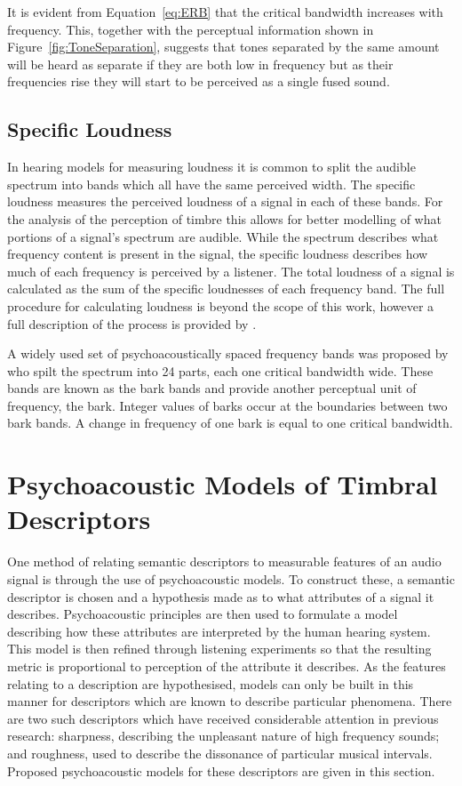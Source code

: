 		It is evident from Equation~\ref{eq:ERB} that the critical bandwidth increases with frequency. This,
		together with the perceptual information shown in Figure~\ref{fig:ToneSeparation}, suggests that tones
		separated by the same amount will be heard as separate if they are both low in frequency but as their
		frequencies rise they will start to be perceived as a single fused sound.

	\subsection{Specific Loudness}
	\label{sec:Timbre-PsychoacousticPrinciples-SpecificLoudness}
		In hearing models for measuring loudness it is common to split the audible spectrum into bands which all
		have the same perceived width. The specific loudness measures the perceived loudness of a signal in each of
		these bands. For the analysis of the perception of timbre this allows for better modelling of what portions
		of a signal's spectrum are audible. While the spectrum describes what frequency content is present in the
		signal, the specific loudness describes how much of each frequency is perceived by a listener.  The total
		loudness of a signal is calculated as the sum of the specific loudnesses of each frequency band. The full
		procedure for calculating loudness is beyond the scope of this work, however a full description of the
		process is provided by \citet{moore1997a}.

		A widely used set of psychoacoustically spaced frequency bands was proposed by
		\citet{zwicker1961subdivision} who spilt the spectrum into 24 parts, each one critical bandwidth wide.
		These bands are known as the bark bands and provide another perceptual unit of frequency, the bark. Integer
		values of barks occur at the boundaries between two bark bands. A change in frequency of one bark is equal
		to one critical bandwidth.

\section{Psychoacoustic Models of Timbral Descriptors}
\label{sec:Timbre-TimbralFeatures}
	One method of relating semantic descriptors to measurable features of an audio signal is through the use of
	psychoacoustic models. To construct these, a semantic descriptor is chosen and a hypothesis made as to what
	attributes of a signal it describes. Psychoacoustic principles are then used to formulate a model describing how
	these attributes are interpreted by the human hearing system. This model is then refined through listening
	experiments so that the resulting metric is proportional to perception of the attribute it describes. As the
	features relating to a description are hypothesised, models can only be built in this manner for descriptors which
	are known to describe particular phenomena. There are two such descriptors which have received considerable
	attention in previous research: sharpness, describing the unpleasant nature of high frequency sounds; and
	roughness, used to describe the dissonance of particular musical intervals. Proposed psychoacoustic models for
	these descriptors are given in this section.
	

